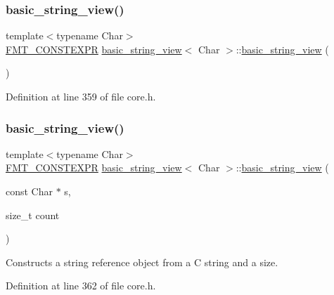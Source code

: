 \subsubsection{\texorpdfstring{basic\+\_\+string\+\_\+view()}{basic\_string\_view()}\hspace{0.1cm}{\footnotesize\ttfamily [1/4]}}
{\footnotesize\ttfamily template$<$typename Char$>$ \\
\hyperlink{core_8h_a69201cb276383873487bf68b4ef8b4cd}{F\+M\+T\+\_\+\+C\+O\+N\+S\+T\+E\+X\+PR} \hyperlink{classbasic__string__view}{basic\+\_\+string\+\_\+view}$<$ Char $>$\+::\hyperlink{classbasic__string__view}{basic\+\_\+string\+\_\+view} (\begin{DoxyParamCaption}{ }\end{DoxyParamCaption})\hspace{0.3cm}{\ttfamily [inline]}}



Definition at line 359 of file core.\+h.

\mbox{\label{classbasic__string__view_a30be409cd941f8fa06e5e7b27496e3dc}} 
\subsubsection{\texorpdfstring{basic\+\_\+string\+\_\+view()}{basic\_string\_view()}\hspace{0.1cm}{\footnotesize\ttfamily [2/4]}}
{\footnotesize\ttfamily template$<$typename Char$>$ \\
\hyperlink{core_8h_a69201cb276383873487bf68b4ef8b4cd}{F\+M\+T\+\_\+\+C\+O\+N\+S\+T\+E\+X\+PR} \hyperlink{classbasic__string__view}{basic\+\_\+string\+\_\+view}$<$ Char $>$\+::\hyperlink{classbasic__string__view}{basic\+\_\+string\+\_\+view} (\begin{DoxyParamCaption}\item[{const Char $\ast$}]{s,  }\item[{size\+\_\+t}]{count }\end{DoxyParamCaption})\hspace{0.3cm}{\ttfamily [inline]}}

Constructs a string reference object from a C string and a size. 

Definition at line 362 of file core.\+h.

